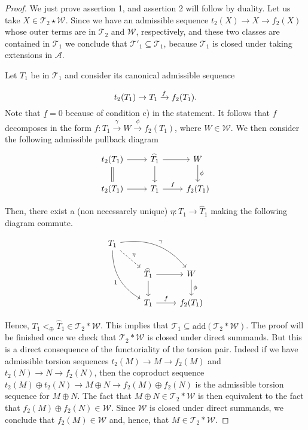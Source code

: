 \begin{proof}
We just prove assertion 1, and assertion 2 will follow by duality.
Let us take $X\in\mathcal{T}_2\star\mathcal{W}$. Since we have an admissible sequence $t_2(X)\longrightarrow X\longrightarrow f_2(X)$ whose outer terms are in $\mathcal{T}_2$ and $\mathcal{W}$, respectively, and these two classes are contained in $\mathcal{T}_1$ we conclude that $\mathcal{T}'_1\subseteq\mathcal{T}_1$, because $\mathcal{T}_1$ is closed under taking extensions in $\mathcal{A}$.



  Let $T_1$ be in $\mathcal{T}_1$ and consider its canonical admissible sequence

  \begin{equation}
    t_2(T_1)\to T_1\xrightarrow{f} f_2(T_1).
  \end{equation}
    Note that $\underline{f}=0$ because of condition c) in the statement. It follows that $f$ decomposes  in the form $f:T_1\stackrel{\gamma}{\longrightarrow}W\stackrel{\phi}{\longrightarrow}f_2(T_1)$, where $W\in\mathcal{W}$. We then consider the following admissible pullback diagram
  \begin{equation}
    \begin{tikzcd}
      t_2(T_1)\arrow{r}\arrow[equal]{d} &
        \widehat{T}_1\arrow{r}\arrow{d} &
          W\arrow{d}{\phi}\\
      t_2(T_1)\arrow{r}&
        T_1\arrow{r}{f}&
          f_2(T_1)
    \end{tikzcd}
  \end{equation}


  Then, there exist a (non necessarely unique) $\eta:T_1\to \widehat{T}_1$ making the following diagram commute.

  \begin{equation}
    \begin{tikzcd}
      T_1\arrow[bend right]{ddr}[']{1}\arrow[dashed]{dr}{\eta}\arrow[bend left]{rrd}{\gamma}&&\\
      &
        \widehat{T}_1\arrow{r}\arrow{d}&
          W\arrow{d}{\phi}\\
      &
        T_1\arrow{r}{f}&
          f_2(T_1)
    \end{tikzcd}
  \end{equation}

  Hence, $T_1 <_\oplus \widehat{T}_1\in \mathcal{T}_2  \ast \mathcal{W}$. This implies that  $\mathcal{T}_1\subseteq \mathrm{add}(\mathcal{T}_2\ast \mathcal{W})$. The proof will be finished once we check that $\mathcal{T}_2\ast \mathcal{W}$ is closed under direct summands. But this is a direct consequence of the functoriality of the torsion pair.
  Indeed if we have admissible torsion sequences $t_2(M)\longrightarrow M\longrightarrow f_2(M)$ and $t_2(N)\longrightarrow N\longrightarrow f_2(N)$, then the coproduct sequence $t_2(M)\oplus t_2(N)\longrightarrow M\oplus N\longrightarrow f_2(M)\oplus f_2(N)$ is the admissible torsion sequence for $M\oplus N$. The fact that $M\oplus N\in\mathcal{T}_2\ast \mathcal{W}$ is then equivalent to the fact that $f_2(M)\oplus f_2(N)\in\mathcal{W}$. Since $\mathcal{W}$ is closed under direct summands, we conclude that $f_2(M)\in\mathcal{W}$ and, hence, that $M\in\mathcal{T}_2\ast\mathcal{W}$.

\end{proof}
